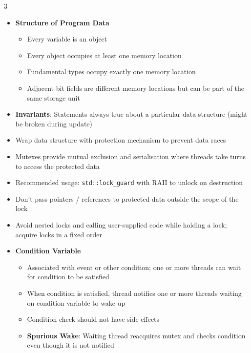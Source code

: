 \documentclass[10pt, landscape]{article}
\begin{document}
\begin{multicols*}{3}
\begin{itemize}
    \item \textbf{Structure of Program Data}
    \begin{itemize}
        \item Every variable is an object
        \item Every object occupies at least one memory location
        \item Fundamental types occupy exactly one memory location
        \item Adjacent bit fields are different memory locations but can be part of the same storage unit
    \end{itemize}
    \item \textbf{Invariants}: Statements always true about a particular data structure (might be broken during update)
    \item Wrap data structure with protection mechanism to prevent data races
    \item Mutexes provide mutual exclusion and serialisation where threads take turns to access the protected data
    \item Recommended usage: \verb|std::lock_guard| with RAII to unlock on destruction
    \item Don't pass pointers / references to protected data outside the scope of the lock
    \item Avoid nested locks and calling user-supplied code while holding a lock; acquire locks in a fixed order
    \item \textbf{Condition Variable}
    \begin{itemize}
        \item Associated with event or other condition; one or more threads can wait for condition to be satisfied
        \item When condition is satisfied, thread notifies one or more threads waiting on condition variable to wake up
        \item Condition check should not have side effects
        \item \textbf{Spurious Wake}: Waiting thread reacquires mutex and checks condition even though it is not notified
    \end{itemize}
\end{itemize}


\end{multicols*}
\end{document}
